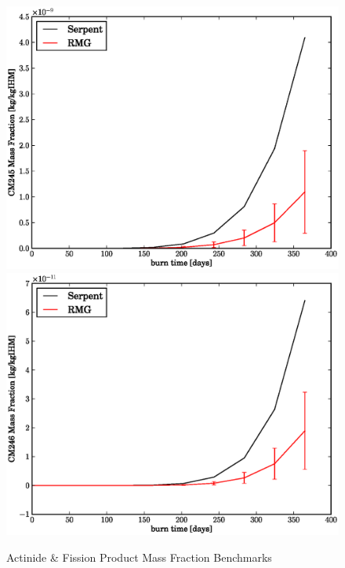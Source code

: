 \begin{figure}[htbp]
\caption{Actinide \& Fission Product Mass Fraction Benchmarks}
\label{act_fp_benchmark}
\begin{center}
\includegraphics[scale=0.3]{multigroup_method/figs/benchmark/CM245_Mass_Fraction_.eps}
\includegraphics[scale=0.3]{multigroup_method/figs/benchmark/CM246_Mass_Fraction_.eps}

\end{center}
\end{figure}
